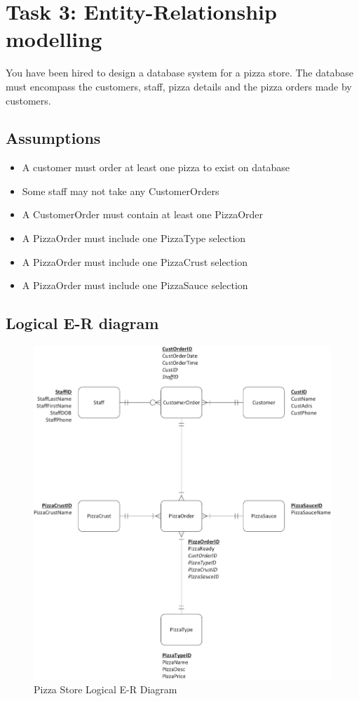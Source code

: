 \newpage
\section{Task 3: Entity-Relationship modelling}

You have been hired to design a database system for a pizza store. The database must encompass the customers, staff, pizza details and the pizza orders made by customers.

\subsection{Assumptions}

\begin{itemize}
\item A customer must order at least one pizza to exist on database
\item Some staff may not take any CustomerOrders
\item A CustomerOrder must contain at least one PizzaOrder
\item A PizzaOrder must include one PizzaType selection
\item A PizzaOrder must include one PizzaCrust selection
\item A PizzaOrder must include one PizzaSauce selection
\end{itemize}

\subsection{Logical E-R diagram}

\begin{figure}[H]
\centering
\caption{Pizza Store Logical E-R Diagram}
\includegraphics[scale=0.5]{./img/CSG1207_A1_PONCE_TASK_3_LER_PIZZA.pdf}
\end{figure}

